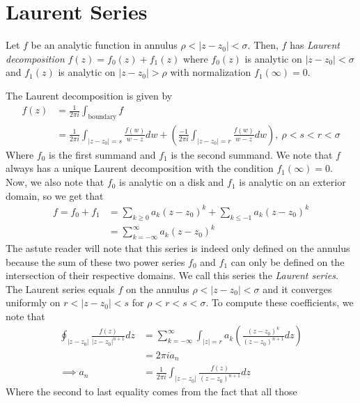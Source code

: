 \documentclass[11pt,leqno,oneside]{amsart}
\numberwithin{thm}{section}
\begin{document}
  \section*{Laurent Series}
  \begin{defn}
    Let $f$ be an analytic function in annulus $\rho < |z-z_0| <
    \sigma$. Then, $f$ has \emph{Laurent decomposition} $f(z) = f_0(z)
    + f_1(z)$ where $f_0(z)$ is analytic on $|z-z_0| < \sigma$ and
    $f_1(z)$ is analytic on $|z-z_0| > \rho$ with normalization $f_1(\infty) = 0$.
  \end{defn}
  The Laurent decomposition is given by
  \begin{align*}
    f(z) & = \frac{1}{2 \pi i} \int_{\text{boundary}} f \\
    \ & = \frac{1}{2 \pi i} \int_{|z-z_0| = s} \frac{f(w)}{w-z} dw +
        \left( \frac{-1}{2 \pi i} \int_{|z-z_0| = r}
        \frac{f(w)}{w-z}dw \right), \ \rho < s < r < \sigma
  \end{align*}
  Where $f_0$ is the first summand and $f_1$ is the second
  summand. We note that $f$ always has a unique Laurent decomposition
  with the condition $f_1(\infty) = 0$. Now, we also note that $f_0$
  is analytic on a disk and $f_1$ is analytic on an exterior domain,
  so we get that
  \begin{align*}
    f = f_0+f_1 & = \sum_{k \geq 0} a_k(z-z_0)^k + \sum_{k \leq -1}
                  a_k(z-z_0)^k \\
    \ & = \sum_{k=-\infty}^\infty a_k(z-z_0)^k
  \end{align*}
  The astute reader will note that this series is indeed only defined
  on the annulus because the sum of these two power series $f_0$ and
  $f_1$ can only be defined on the intersection of their respective
  domains. We call this series the \emph{Laurent series}. The Laurent
  series equals $f$ on the annulus $\rho < |z-z_0| < \sigma$ and it
  converges uniformly on $r < |z-z_0| < s$ for $\rho < r < s <
  \sigma$. To compute these coefficients, we note that
  \begin{align*}
    \oint_{|z-z_0|} \frac{f(z)}{|z-z_0|^{n+1}} dz
    & = \sum_{k=-\infty}^\infty \int_{|z|=r} a_k \left(
      \frac{(z-z_0)^k}{(z-z_0)^{n+1}} dz \right) \\
    \ & = 2 \pi i a_n \\
    \implies a_n & = \frac{1}{2 \pi i} \int_{|z-z_0|}
                 \frac{f(z)}{(z-z_0)^{n+1}}dz
  \end{align*}
  Where the second to last equality comes from the fact that all those
\end{document}
